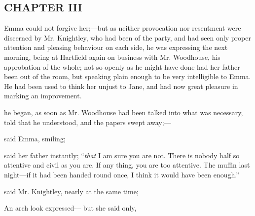 \subsection[chapter-iii-1]{\useURL[url22][][][]\from[url22]CHAPTER III}

Emma could not forgive her;---but as neither provocation nor resentment were discerned by Mr. Knightley, who had been of the party, and had seen only proper attention and pleasing behaviour on each side, he was expressing the next morning, being at Hartfield again on business with Mr. Woodhouse, his approbation of the whole; not so openly as he might have done had her father been out of the room, but speaking plain enough to be very intelligible to Emma. He had been used to think her unjust to Jane, and had now great pleasure in marking an improvement.

 he began, as soon as Mr. Woodhouse had been talked into what was necessary, told that he understood, and the papers swept away;---

 said Emma, smiling; 

 said her father instantly; “{\em that} I am sure you are not. There is nobody half so attentive and civil as you are. If any thing, you are too attentive. The muffin last night---if it had been handed round once, I think it would have been enough.”

 said Mr. Knightley, nearly at the same time; 

An arch look expressed--- but she said only, 


